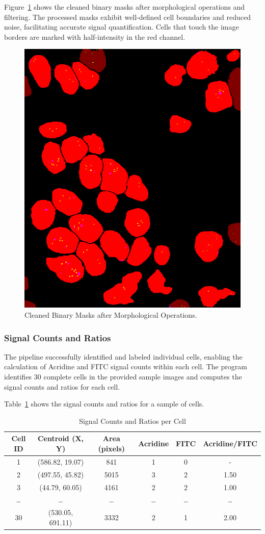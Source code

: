 \documentclass[a4paper,12pt]{article}
\begin{document}
Figure~\ref{fig:cell_binary_masks_cleaned} shows the cleaned binary masks after morphological operations and filtering. The processed masks exhibit well-defined cell boundaries and reduced noise, facilitating accurate signal quantification. Cells that touch the image borders are marked with half-intensity in the red channel.

\begin{figure}[!htbp]
    \centering
    \includegraphics[width=0.5\linewidth]{data/output/fish_signal_counts/binary_masks_cleaned.png}
    \caption{Cleaned Binary Masks after Morphological Operations.}
    \label{fig:cell_binary_masks_cleaned}
\end{figure}

\subsubsection{Signal Counts and Ratios}

The pipeline successfully identified and labeled individual cells, enabling the calculation of Acridine and FITC signal counts within each cell. The program identifies 30 complete cells in the provided sample images and computes the signal counts and ratios for each cell.

Table~\ref{tab:results} shows the signal counts and ratios for a sample of cells.

\begin{table}[!htbp]
    \centering
    \caption{Signal Counts and Ratios per Cell}
    \label{tab:results}
    \begin{tabular}{|c|c|c|c|c|c|}
        \hline
        \textbf{Cell ID} & \textbf{Centroid (X, Y)} & \textbf{Area (pixels)} & \textbf{Acridine} & \textbf{FITC} & \textbf{Acridine/FITC} \\
        \hline
        1 & (586.82, 19.07) & 841 & 1 & 0 & - \\
        2 & (497.55, 45.82) & 5015 & 3 & 2 & 1.50 \\
        3 & (44.79, 60.05) & 4161 & 2 & 2 & 1.00 \\
        \ldots & \ldots & \ldots & \ldots & \ldots & \ldots \\
        30 & (530.05, 691.11) & 3332 & 2 & 1 & 2.00 \\
        \hline
    \end{tabular}
\end{table}
\end{document}
